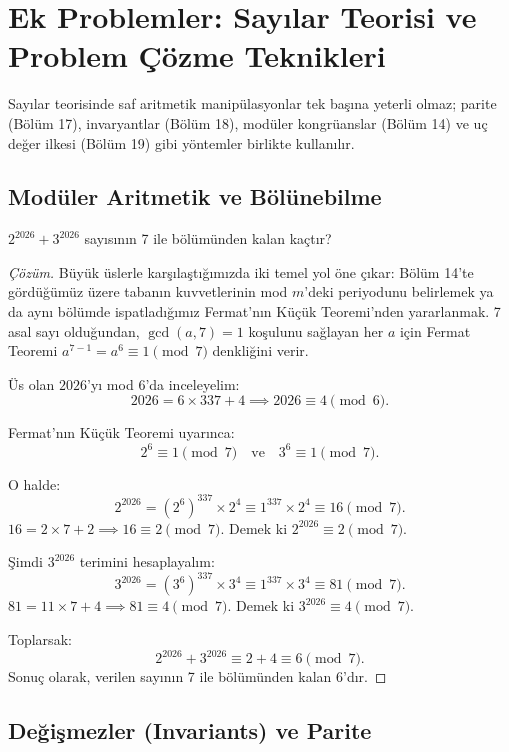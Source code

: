 \section{Ek Problemler: Sayılar Teorisi ve Problem Çözme Teknikleri}

Sayılar teorisinde saf aritmetik manipülasyonlar tek başına yeterli olmaz; parite (Bölüm 17), invaryantlar (Bölüm 18), modüler kongrüanslar (Bölüm 14) ve uç değer ilkesi (Bölüm 19) gibi yöntemler birlikte kullanılır.

\subsection{Modüler Aritmetik ve Bölünebilme}

\begin{example}
$2^{2026} + 3^{2026}$ sayısının 7 ile bölümünden kalan kaçtır?
\end{example}

\begin{proof}[Çözüm]
Büyük üslerle karşılaştığımızda iki temel yol öne çıkar: Bölüm 14'te gördüğümüz üzere tabanın kuvvetlerinin mod $m$'deki periyodunu belirlemek ya da aynı bölümde ispatladığımız Fermat'nın Küçük Teoremi'nden yararlanmak. 7 asal sayı olduğundan, $\gcd(a, 7) = 1$ koşulunu sağlayan her $a$ için Fermat Teoremi $a^{7-1} = a^6 \equiv 1 \pmod 7$ denkliğini verir.

Üs olan $2026$'yı mod $6$'da inceleyelim:
\[
2026 = 6 \times 337 + 4 \implies 2026 \equiv 4 \pmod 6.
\]

Fermat'nın Küçük Teoremi uyarınca:
\[
2^6 \equiv 1 \pmod 7 \quad \text{ve} \quad 3^6 \equiv 1 \pmod 7.
\]

O halde:
\[
2^{2026} = (2^6)^{337} \times 2^4 \equiv 1^{337} \times 2^4 \equiv 16 \pmod 7.
\]
$16 = 2 \times 7 + 2 \implies 16 \equiv 2 \pmod 7$. Demek ki $2^{2026} \equiv 2 \pmod 7$.

Şimdi $3^{2026}$ terimini hesaplayalım:
\[
3^{2026} = (3^6)^{337} \times 3^4 \equiv 1^{337} \times 3^4 \equiv 81 \pmod 7.
\]
$81 = 11 \times 7 + 4 \implies 81 \equiv 4 \pmod 7$. Demek ki $3^{2026} \equiv 4 \pmod 7$.

Toplarsak:
\[
2^{2026} + 3^{2026} \equiv 2 + 4 \equiv 6 \pmod 7.
\]
Sonuç olarak, verilen sayının 7 ile bölümünden kalan 6'dır.
\end{proof}

\subsection{Değişmezler (Invariants) ve Parite}

